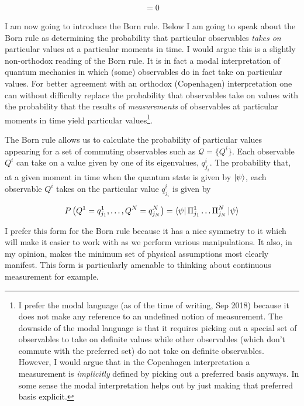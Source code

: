 \documentclass[12pt]{article}
\begin{document}
\begin{align}
[Q^i,Q^j] = 0
\end{align}

I am now going to introduce the Born rule. Below I am going to speak about the Born rule as determining the probability that particular observables \textit{takes on} particular values at a particular moments in time. I would argue this is a slightly non-orthodox reading of the Born rule. It is in fact a modal interpretation of quantum mechanics in which (some) observables do in fact take on particular values. For better agreement with an orthodox (Copenhagen) interpretation one can without difficulty replace the probability that observables take on values with the probability that the results of \textit{measurements} of observables at particular moments in time yield particular values\footnote{I prefer the modal language (as of the time of writing, Sep 2018) because it does not make any reference to an undefined notion of measurement. The downside of the modal language is that it requires picking out a special set of observables to take on definite values while other observables (which don't commute with the preferred set) do not take on definite observables. However, I would argue that in the Copenhagen interpretation a measurement is \textit{implicitly} defined by picking out a preferred basis anyways. In some sense the modal interpretation helps out by just making that preferred basis explicit.}.

The Born rule allows us to calculate the probability of particular values appearing for a set of commuting observables such as $\mathcal{Q} = \{Q^i\}$. Each observable $Q^i$ can take on a value given by one of its eigenvalues, $q^i_{j_i}$. The probability that, at a given moment in time when the quantum state is given by $\ket{\psi}$, each observable $Q^i$ takes on the particular value $q^i_{j_i}$ is given by

\begin{align}
P\left(Q^1 = q^1_{j_1}, \ldots, Q^N = q^N_{j_N}\right) = \Bra{\psi} \Pi^1_{j_1} \ldots \Pi^N_{j_N} \Ket{\psi}
\end{align}

I prefer this form for the Born rule because it has a nice symmetry to it which will make it easier to work with as we perform various manipulations. It also, in my opinion, makes the minimum set of physical assumptions most clearly manifest. This form is particularly amenable to thinking about continuous measurement for example.
\end{document}
